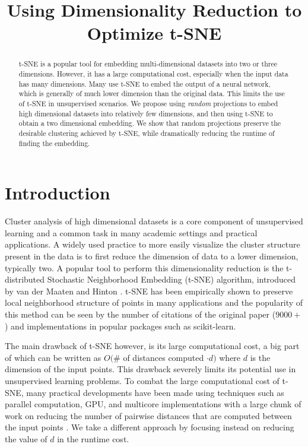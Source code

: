 \documentclass[12pt]{opt2019} %
\title[Using Dimensionality Reduction to Optimize t-SNE]{Using Dimensionality Reduction to Optimize t-SNE}
\begin{document}
\maketitle

\begin{abstract}%
t-SNE is a popular tool for embedding multi-dimensional datasets into two or three dimensions.  However, it has a large computational cost, especially when the input data has many dimensions.  Many use t-SNE to embed the output of a neural network, which is generally of much lower dimension than the original data.  This limits the use of t-SNE in unsupervised scenarios.  We propose using \textit{random} projections to embed high dimensional datasets into relatively few dimensions, and then using t-SNE to obtain a two dimensional embedding.  We show that random projections preserve the desirable clustering achieved by t-SNE, while dramatically reducing the runtime of finding the embedding.
\end{abstract}


\section{Introduction}\label{sec:intro}
Cluster analysis of high dimensional datasets is a core component of unsupervised learning and a common task in many academic settings and practical applications. A widely used practice to more easily visualize the cluster structure present in the data is to first reduce the dimension of data to a lower dimension, typically two. A popular tool to perform this dimensionality reduction is the t-distributed Stochastic Neighborhood Embedding (t-SNE) algorithm, introduced by van der Maaten and Hinton \cite{orig_tsne}. t-SNE has been empirically shown to preserve local neighborhood structure of points in many applications and the popularity of this method can be seen by the number of citations of the original paper ($9000+$) and implementations in popular packages such as scikit-learn.

The main drawback of t-SNE however, is its large computational cost, a big part of which can be written as $O($\# of distances computed $\cdot d)$ where $d$ is the dimension of the input points.  This drawback severely limits its potential use in unsupervised learning problems. To combat the large computational cost of t-SNE, many practical developments have been made using techniques such as parallel computation, GPU, and multicore implementations with a large chunk of work on reducing the number of pairwise distances that are computed between the input points \cite{gpu1, gpu2, treebased}. We take a different approach by focusing instead on reducing the value of $d$ in the runtime cost.
\end{document}
